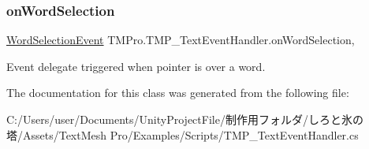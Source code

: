 \subsubsection{\texorpdfstring{on\+Word\+Selection}{onWordSelection}}
{\footnotesize\ttfamily \hyperlink{class_t_m_pro_1_1_t_m_p___text_event_handler_1_1_word_selection_event}{Word\+Selection\+Event} T\+M\+Pro.\+T\+M\+P\+\_\+\+Text\+Event\+Handler.\+on\+Word\+Selection\hspace{0.3cm}{\ttfamily [get]}, {\ttfamily [set]}}



Event delegate triggered when pointer is over a word. 



The documentation for this class was generated from the following file\+:\begin{DoxyCompactItemize}
\item 
C\+:/\+Users/user/\+Documents/\+Unity\+Project\+File/制作用フォルダ/しろと氷の塔/\+Assets/\+Text\+Mesh Pro/\+Examples/\+Scripts/T\+M\+P\+\_\+\+Text\+Event\+Handler.\+cs\end{DoxyCompactItemize}
